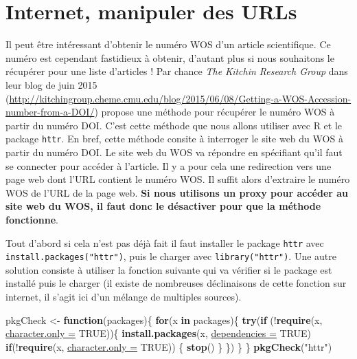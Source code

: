 \documentclass[twoside,symmetric]{book}
\newenvironment{Shaded}{}{}
\newcommand{\ControlFlowTok}[1]{\textbf{#1}}
\newcommand{\DataTypeTok}[1]{\underline{#1}}
\newcommand{\KeywordTok}[1]{\textbf{#1}}
\newcommand{\NormalTok}[1]{#1}
\newcommand{\OperatorTok}[1]{#1}
\newcommand{\OtherTok}[1]{#1}
\newcommand{\StringTok}[1]{#1}
\begin{document}
\hypertarget{studyCase002}{%
\chapter{Internet, manipuler des URLs}\label{studyCase002}}

Il peut être intéressant d'obtenir le numéro WOS d'un article scientifique. Ce numéro est cependant fastidieux à obtenir, d'autant plus si nous souhaitons le récupérer pour une liste d'articles ! Par chance \emph{The Kitchin Research Group} dans leur blog de juin 2015 (\url{http://kitchingroup.cheme.cmu.edu/blog/2015/06/08/Getting-a-WOS-Accession-number-from-a-DOI/}) propose une méthode pour récupérer le numéro WOS à partir du numéro DOI. C'est cette méthode que nous allons utiliser avec R et le package \texttt{httr}. En bref, cette méthode consite à interroger le site web du WOS à partir du numéro DOI. Le site web du WOS va répondre en spécifiant qu'il faut se connecter pour accéder à l'article. Il y a pour cela une redirection vers une page web dont l'URL contient le numéro WOS. Il suffit alors d'extraire le numéro WOS de l'URL de la page web. \textbf{Si nous utilisons un proxy pour accéder au site web du WOS, il faut donc le désactiver pour que la méthode fonctionne}.

Tout d'abord si cela n'est pas déjà fait il faut installer le package \texttt{httr} avec \texttt{install.packages("httr")}, puis le charger avec \texttt{library("httr")}. Une autre solution consiste à utiliser la fonction suivante qui va vérifier si le package est installé puis le charger (il existe de nombreuses déclinaisons de cette fonction sur internet, il s'agit ici d'un mélange de multiples sources).

\begin{Shaded}
\begin{Highlighting}[]
\NormalTok{pkgCheck <-}\StringTok{ }\ControlFlowTok{function}\NormalTok{(packages)\{}
    \ControlFlowTok{for}\NormalTok{(x }\ControlFlowTok{in}\NormalTok{ packages)\{}
        \KeywordTok{try}\NormalTok{(}\ControlFlowTok{if}\NormalTok{ (}\OperatorTok{!}\KeywordTok{require}\NormalTok{(x, }\DataTypeTok{character.only =} \OtherTok{TRUE}\NormalTok{))\{}
            \KeywordTok{install.packages}\NormalTok{(x, }\DataTypeTok{dependencies =} \OtherTok{TRUE}\NormalTok{)}
            \ControlFlowTok{if}\NormalTok{(}\OperatorTok{!}\KeywordTok{require}\NormalTok{(x, }\DataTypeTok{character.only =} \OtherTok{TRUE}\NormalTok{)) \{}
                \KeywordTok{stop}\NormalTok{()}
\NormalTok{            \}}
\NormalTok{        \})}
\NormalTok{    \}}
\NormalTok{\}}
\KeywordTok{pkgCheck}\NormalTok{(}\StringTok{"httr"}\NormalTok{)}
\end{Highlighting}
\end{Shaded}
\end{document}
